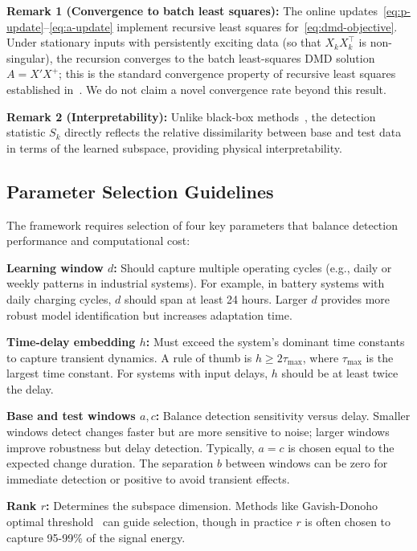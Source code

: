 \documentclass[conference]{IEEEtran}
\begin{document}
\textbf{Remark 1 (Convergence to batch least squares):} The online updates~\eqref{eq:p-update}--\eqref{eq:a-update} implement recursive least squares for~\eqref{eq:dmd-objective}. Under stationary inputs with persistently exciting data (so that \(X_k X_k^\top\) is non-singular), the recursion converges to the batch least-squares DMD solution \(A = X' X^+\); this is the standard convergence property of recursive least squares established in~\cite{Zhang2019}. We do not claim a novel convergence rate beyond this result.

\textbf{Remark 2 (Interpretability):} Unlike black-box methods~\cite{DeRyck2021}, the detection statistic \(S_k\) directly reflects the relative dissimilarity between base and test data in terms of the learned subspace, providing physical interpretability.

\subsection{Parameter Selection Guidelines}

The framework requires selection of four key parameters that balance detection performance and computational cost:

\textbf{Learning window \(d\):} Should capture multiple operating cycles (e.g., daily or weekly patterns in industrial systems). For example, in battery systems with daily charging cycles, \(d\) should span at least 24 hours. Larger \(d\) provides more robust model identification but increases adaptation time.

\textbf{Time-delay embedding \(h\):} Must exceed the system's dominant time constants to capture transient dynamics. A rule of thumb is \(h \geq 2\tau_{\max}\), where \(\tau_{\max}\) is the largest time constant. For systems with input delays, \(h\) should be at least twice the delay.

\textbf{Base and test windows \(a, c\):} Balance detection sensitivity versus delay. Smaller windows detect changes faster but are more sensitive to noise; larger windows improve robustness but delay detection. Typically, \(a = c\) is chosen equal to the expected change duration. The separation \(b\) between windows can be zero for immediate detection or positive to avoid transient effects.

\textbf{Rank \(r\):} Determines the subspace dimension. Methods like Gavish-Donoho optimal threshold~\cite{Gavish2014} can guide selection, though in practice \(r\) is often chosen to capture 95-99\% of the signal energy.
\end{document}
